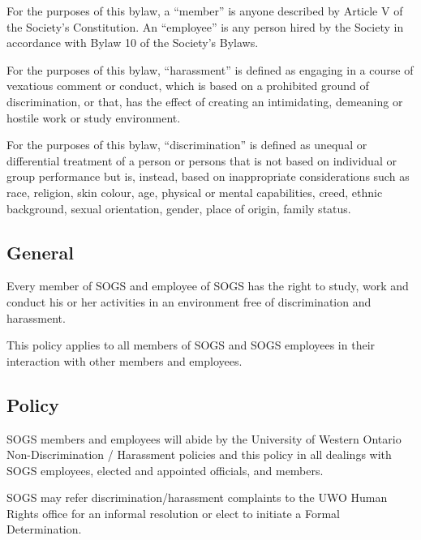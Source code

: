 \begin{longenum}[ label*=\thesubsection.\arabic*., align=left]
	\item For the purposes of this bylaw, a ``member'' is anyone described by Article V of the Society's Constitution.
An ``employee'' is any person hired by the Society in accordance with Bylaw 10 of the Society's
Bylaws.
	\item For the purposes of this bylaw, ``harassment'' is defined as engaging in a course of vexatious comment or conduct, which is based on a prohibited ground of discrimination, or that, has the effect of creating an intimidating, demeaning or hostile work or study environment.
    \item For the purposes of this bylaw, ``discrimination'' is defined as unequal or differential treatment of a person or persons that is not based on individual or group performance but is, instead, based on inappropriate considerations such as race, religion, skin colour, age, physical or mental capabilities, creed, ethnic background, sexual orientation, gender, place of origin, family status. 
\end{longenum}

\subsection{General}
\begin{longenum}[ label*=\thesubsection.\arabic*., align=left]
	\item Every member of SOGS and employee of SOGS has the right to study, work and conduct his or her activities in an environment free of discrimination and harassment.
    \item This policy applies to all members of SOGS and SOGS employees in their interaction with other members and employees.
\end{longenum}
\subsection{Policy}
\begin{longenum}[ label*=\thesubsection.\arabic*., align=left]
	\item SOGS members and employees will abide by the University of Western Ontario Non-Discrimination / Harassment policies and this policy in all dealings with SOGS employees, elected and appointed officials, and members.
    \item SOGS may refer discrimination/harassment complaints to the UWO Human Rights office for an informal resolution or elect to initiate a Formal Determination.
\end{longenum}
